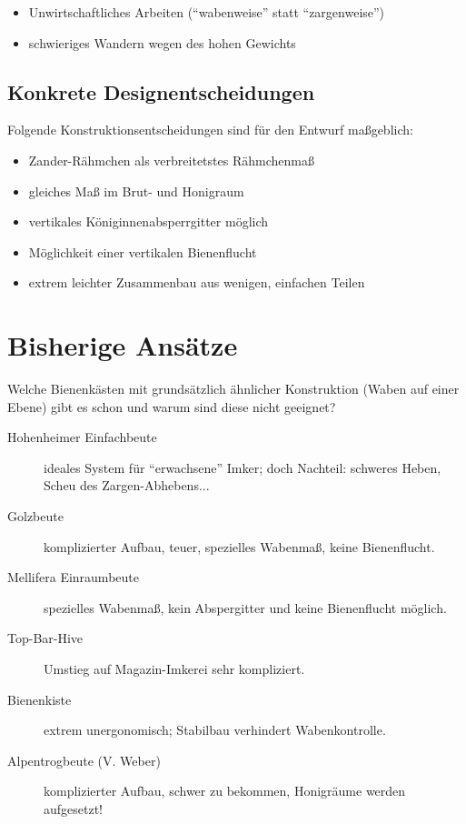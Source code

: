 \documentclass[12pt,a4paper,ngerman]{scrartcl}
\begin{document}
\begin{itemize}
\item Unwirtschaftliches Arbeiten (\enquote{wabenweise} statt \enquote{zargenweise})
\item schwieriges Wandern wegen des hohen Gewichts
\end{itemize}


\subsection{Konkrete Designentscheidungen}

Folgende Konstruktionsentscheidungen sind für den Entwurf maßgeblich:

\begin{itemize}
\item Zander-Rähmchen als verbreitetstes Rähmchenmaß
\item gleiches Maß im Brut- und Honigraum
\item vertikales Königinnenabsperrgitter möglich
\item Möglichkeit einer vertikalen Bienenflucht
\item extrem leichter Zusammenbau aus wenigen, einfachen Teilen
\end{itemize}


\section{Bisherige Ansätze}

Welche Bienenkästen mit grundsätzlich ähnlicher Konstruktion (Waben auf einer Ebene) gibt es schon und warum sind diese nicht geeignet?

\begin{description}
\item[Hohenheimer Einfachbeute] ideales System für \enquote{erwachsene} Imker; doch Nachteil: schweres Heben, Scheu des Zargen-Abhebens...
\item[Golzbeute] komplizierter Aufbau, teuer, spezielles Wabenmaß, keine Bienenflucht.
\item[Mellifera Einraumbeute] spezielles Wabenmaß, kein Abspergitter und keine Bienenflucht möglich.
\item[Top-Bar-Hive] Umstieg auf Magazin-Imkerei sehr kompliziert.
\item[Bienenkiste] extrem unergonomisch; Stabilbau verhindert Wabenkontrolle.
\item[Alpentrogbeute (V. Weber)] komplizierter Aufbau, schwer zu bekommen, Honigräume werden aufgesetzt!
\end{description}
\end{document}
